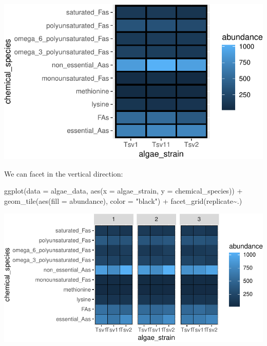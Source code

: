 \documentclass[
]{krantz}
\newenvironment{Shaded}{\begin{snugshade}}{\end{snugshade}}
\newcommand{\AttributeTok}[1]{\textcolor[rgb]{0.77,0.63,0.00}{#1}}
\newcommand{\FunctionTok}[1]{\textcolor[rgb]{0.00,0.00,0.00}{#1}}
\newcommand{\NormalTok}[1]{#1}
\newcommand{\SpecialCharTok}[1]{\textcolor[rgb]{0.00,0.00,0.00}{#1}}
\newcommand{\StringTok}[1]{\textcolor[rgb]{0.31,0.60,0.02}{#1}}
\begin{document}
\begin{center}\includegraphics{index_files/figure-latex/unnamed-chunk-56-1} \end{center}

We can facet in the vertical direction:

\begin{Shaded}
\begin{Highlighting}[]
\FunctionTok{ggplot}\NormalTok{(}\AttributeTok{data =}\NormalTok{ algae\_data, }\FunctionTok{aes}\NormalTok{(}\AttributeTok{x =}\NormalTok{ algae\_strain, }\AttributeTok{y =}\NormalTok{ chemical\_species)) }\SpecialCharTok{+} 
  \FunctionTok{geom\_tile}\NormalTok{(}\FunctionTok{aes}\NormalTok{(}\AttributeTok{fill =}\NormalTok{ abundance), }\AttributeTok{color =} \StringTok{"black"}\NormalTok{) }\SpecialCharTok{+} 
  \FunctionTok{facet\_grid}\NormalTok{(replicate}\SpecialCharTok{\textasciitilde{}}\NormalTok{.)}
\end{Highlighting}
\end{Shaded}

\begin{center}\includegraphics{index_files/figure-latex/unnamed-chunk-57-1} \end{center}
\end{document}
